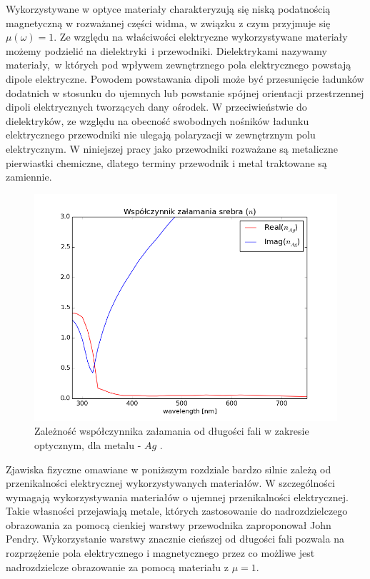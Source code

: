 Wykorzystywane w optyce materiały charakteryzują się niską podatnością magnetyczną w rozważanej części widma, w związku z czym przyjmuje się $\mu(\omega)=1$. Ze względu na właściwości elektryczne wykorzystywane materiały możemy  podzielić na dielektryki~i przewodniki. Dielektrykami nazywamy materiały,~w których pod wpływem zewnętrznego pola elektrycznego powstają dipole elektryczne. Powodem powstawania dipoli może być przesunięcie ładunków dodatnich w stosunku do ujemnych lub powstanie spójnej orientacji przestrzennej dipoli elektrycznych tworzących dany ośrodek. W przeciwieństwie do dielektryków, ze względu na obecność swobodnych nośników ładunku elektrycznego przewodniki nie ulegają polaryzacji w zewnętrznym polu elektrycznym. W niniejszej pracy jako przewodniki rozważane są metaliczne pierwiastki chemiczne, dlatego terminy przewodnik i metal traktowane są zamiennie.

\begin{figure}[tb]
	\includegraphics[width=\textwidth]{images/agn.png}
	\caption{Zależność współczynnika załamania od długości fali w zakresie optycznym, dla metalu - $Ag$ \cite{PhysRevB.6.4370}.  }
	\label{fig:agn}
\end{figure}
Zjawiska fizyczne omawiane w poniższym rozdziale bardzo silnie zależą od przenikalności elektrycznej wykorzystywanych materiałów. W szczególności wymagają wykorzystywania materiałów o ujemnej przenikalności elektrycznej. Takie własności przejawiają metale, których zastosowanie do nadrozdzielczego obrazowania za pomocą cienkiej warstwy przewodnika zaproponował John Pendry. Wykorzystanie warstwy znacznie cieńszej od długości fali pozwala na rozprzężenie pola elektrycznego i magnetycznego przez co możliwe jest nadrozdzielcze obrazowanie za pomocą materiału z $\mu=1$. \cite{PhysRevLett.85.3966}

